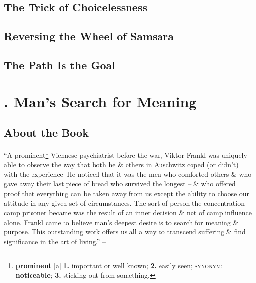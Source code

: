 \documentclass[oneside]{book}
\numberwithin{equation}{section}
\begin{document}
\section{The Trick of Choicelessness}


\section{Reversing the Wheel of Samsara}


\section{The Path Is the Goal}


\chapter{\cite{Frankl2013, Frankl2017, Frankl2022}. Man's Search for Meaning}

\section*{About the Book}
``A prominent\footnote{\textbf{prominent} [a] \textbf{1.} important or well known; \textbf{2.} easily seen; \textsc{synonym}: \textbf{noticeable}; \textbf{3.} sticking out from something.} Viennese psychiatrist before the war, Viktor Frankl was uniquely able to observe the way that both he \& others in Auschwitz coped (or didn't) with the experience. He noticed that it was the men who comforted others \& who gave away their last piece of bread who survived the longest -- \& who offered proof that everything can be taken away from us except the ability to choose our attitude in any given set of circumstances. The sort of person the concentration camp prisoner became was the result of an inner decision \& not of camp influence alone. Frankl came to believe man's deepest desire is to search for meaning \& purpose. This outstanding work offers us all a way to transcend suffering \& find significance in the art of living.'' -- \cite[About the Book, p. 3]{Frankl2013}

\end{document}
